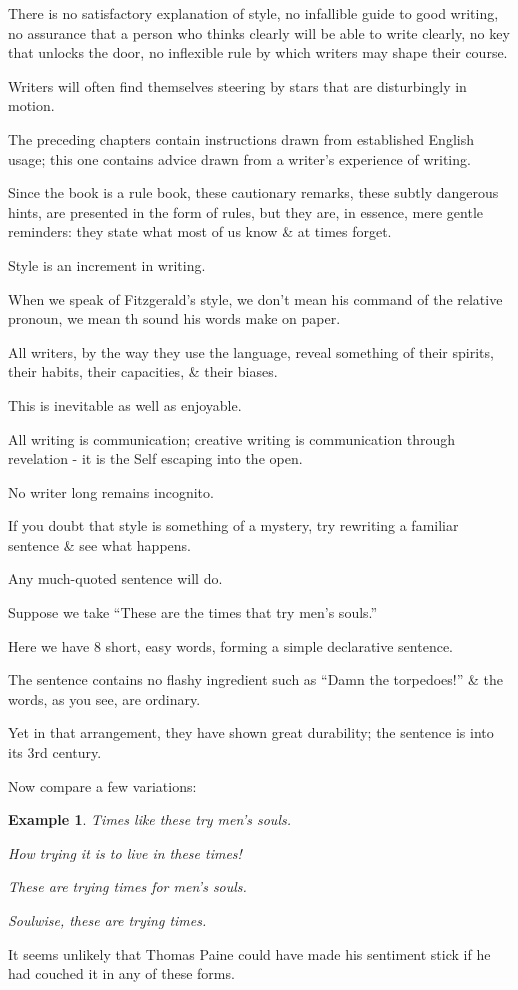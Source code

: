 \documentclass{article}
\newtheorem{example}{Example}
\begin{document}
There is no satisfactory explanation of style, no infallible guide to good writing, no assurance that a person who thinks clearly will be able to write clearly, no key that unlocks the door, no inflexible rule by which writers may shape their course.

Writers will often find themselves steering by stars that are disturbingly in motion.

%
The preceding chapters contain instructions drawn from established English usage; this one contains advice drawn from a writer's experience of writing.

Since the book is a rule book, these cautionary remarks, these subtly dangerous hints, are presented in the form of rules, but they are, in essence, mere gentle reminders: they state what most of us know \& at times forget.

%
Style is an increment in writing.

When we speak of Fitzgerald's style, we don't mean his command of the relative pronoun, we mean th sound his words make on paper.

All writers, by the way they use the language, reveal something of their spirits, their habits, their capacities, \& their biases.

This is inevitable as well as enjoyable.

All writing is communication; creative writing is communication through revelation - it is the Self escaping into the open.

No writer long remains incognito.

%
If you doubt that style is something of a mystery, try rewriting a familiar sentence \& see what happens.

Any much-quoted sentence will do.

Suppose we take ``These are the times that try men's souls.''

Here we have 8 short, easy words, forming a simple declarative sentence.

The sentence contains no flashy ingredient such as ``Damn the torpedoes!'' \& the words, as you see, are ordinary.

Yet in that arrangement, they have shown great durability; the sentence is into its 3rd century.

Now compare a few variations:
\begin{example}
	Times like these try men's souls.
	
	How trying it is to live in these times!
	
	These are trying times for men's souls.
	
	Soulwise, these are trying times.
\end{example}
It seems unlikely that Thomas Paine could have made his sentiment stick if he had couched it in any of these forms.
\end{document}
